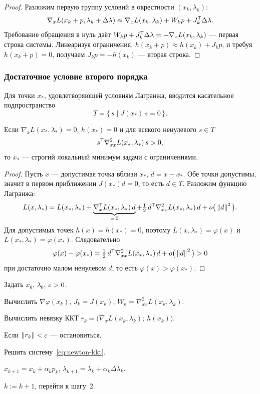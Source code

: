 \begin{proof}
Разложим первую группу условий в окрестности $(x_k, \lambda_k)$:
\[
  \nabla_x L(x_k + p, \lambda_k + \Delta\lambda)
  \approx \nabla_x L(x_k,\lambda_k) + W_k p + J_k^{\mathsf{T}} \Delta\lambda .
\]
Требование обращения в нуль даёт
$W_k p + J_k^{\mathsf{T}}\Delta\lambda = -\nabla_x L(x_k,\lambda_k)$ — первая строка
системы. Линеаризуя ограничения, $h(x_k + p) \approx h(x_k) + J_k p$, и
требуя $h(x_k+p) = 0$, получаем $J_k p = -h(x_k)$ — вторая строка.
\end{proof}

\subsubsection*{Достаточное условие второго порядка}

Для точки $x_*$, удовлетворяющей условиям Лагранжа, вводится касательное
подпространство
\[
  T = \{\, s \mid J(x_*)\,s = 0 \,\} .
\]

\begin{theorem}\label{thm:second-order-suff}
Если $\nabla_x L(x_*,\lambda_*) = 0$, $h(x_*) = 0$ и для всякого ненулевого
$s \in T$
\[
  s^{\mathsf{T}} \nabla^2_{xx} L(x_*, \lambda_*)\, s > 0 ,
\]
то $x_*$ — строгий локальный минимум задачи с ограничениями.
\end{theorem}

\begin{proof}
Пусть $x$ — допустимая точка вблизи $x_*$, $d = x - x_*$. Обе точки допустимы,
значит в первом приближении $J(x_*)d = 0$, то есть $d \in T$. Разложим функцию
Лагранжа:
\[
  L(x, \lambda_*) = L(x_*,\lambda_*)
    + \underbrace{\nabla_x^{\mathsf{T}} L(x_*,\lambda_*)\,d}_{=\,0}
    + \tfrac12\, d^{\mathsf{T}} \nabla^2_{xx}L(x_*,\lambda_*)\, d + o\big(\left\lVert d \right\rVert^2\big) .
\]
Для допустимых точек $h(x) = h(x_*) = 0$, поэтому $L(x,\lambda_*) = \varphi(x)$
и $L(x_*,\lambda_*) = \varphi(x_*)$. Следовательно
\[
  \varphi(x) - \varphi(x_*)
  = \tfrac12\, d^{\mathsf{T}} \nabla^2_{xx}L(x_*,\lambda_*)\, d + o\big(\left\lVert d \right\rVert^2\big) > 0
\]
при достаточно малом ненулевом $d$, то есть $\varphi(x) > \varphi(x_*)$.
\end{proof}

\begin{algo}[title={Метод Ньютона для задачи с равенствами}]
\begin{steps}
  \item Задать $x_0$, $\lambda_0$, $\varepsilon > 0$.
  \item Вычислить $\nabla\varphi(x_k)$, $J_k = J(x_k)$,
        $W_k = \nabla^2_{xx}L(x_k,\lambda_k)$.
  \item Вычислить невязку ККТ
        $r_k = \big(\nabla_x L(x_k,\lambda_k);\ h(x_k)\big)$.
  \item Если $\left\lVert r_k \right\rVert < \varepsilon$ — остановиться.
  \item Решить систему~\eqref{eq:newton-kkt}.
  \item $x_{k+1} = x_k + \alpha_k p_k$,
        $\lambda_{k+1} = \lambda_k + \alpha_k \Delta\lambda_k$.
  \item $k := k+1$, перейти к шагу~2.
\end{steps}
\end{algo}

